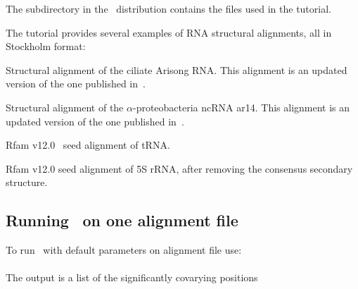 The subdirectory  in the \rscape\ distribution contains the
files used in the tutorial. 

The tutorial provides several examples of RNA structural
alignments, all in Stockholm format:

\begin{sreitems}{}
\item[\emprog{updated\_Arisong.sto}] Structural alignment of the ciliate
  Arisong RNA. This alignment is an updated
  version of the one published in~\citep{JungEddy11}.
\item[\emprog{ar14.sto}] Structural alignment of the $\alpha$-proteobacteria ncRNA ar14. This alignment is an updated version of the one
  published in~\citep{delVal12}.
\item[\emprog{RF00005.sto}] Rfam v12.0~\citep{Nawrocki15} seed alignment of tRNA. 
\item[\emprog{RF00001-noss.sto}] Rfam v12.0 seed alignment of 5S rRNA, after removing the consensus secondary structure. 
\end{sreitems}


\subsection{Running \rscape\, on one alignment file}
To run \rscape\ with default parameters on alignment file
 use:\\

\\

\noindent
The output is a list of the significantly covarying positions

